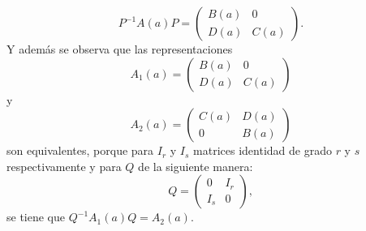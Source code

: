 \documentclass[12pt]{book}
\theoremstyle{definition}
\newcounter{in}
\begin{document}
\begin{equation*}
  P^{-1}A\left(a\right)P=
  \begin{pmatrix}
    B\left(a\right) & 0 \\
    D\left(a\right) & C\left(a\right)
  \end{pmatrix}. 
\end{equation*}  
Y además se observa que las representaciones
\begin{equation*}
  A_{1}\left(a\right)=
  \begin{pmatrix}
    B\left(a\right) & 0 \\
    D\left(a\right) & C\left(a\right)
  \end{pmatrix}
\end{equation*}
y
\begin{equation*} 
   A_{2}\left(a\right)=
  \begin{pmatrix}
    C\left(a\right) & D\left(a\right) \\
    0 & B\left(a\right)
  \end{pmatrix}
\end{equation*}
son equivalentes, porque para $I_{r}$ y $I_{s}$ matrices identidad de
grado $r$ y $s$ respectivamente y para $Q$ de la siguiente manera:
\begin{equation*}
  Q=
  \begin{pmatrix}
    0 & I_{r} \\ 
    I_{s} & 0
  \end{pmatrix},
\end{equation*}
se tiene que $Q^{-1}A_{1}\left(a\right)Q=A_{2}\left(a\right)$.
\end{document}
